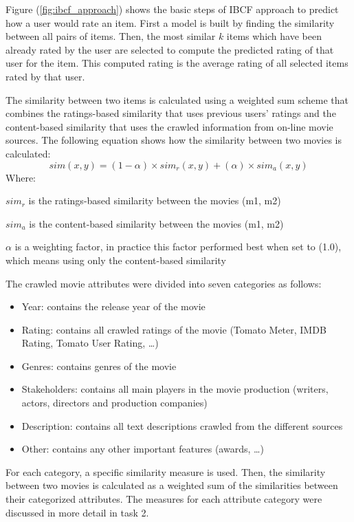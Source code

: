 \documentclass{sigish}
\begin{document}
Figure (\ref{fig:ibcf_approach}) shows the basic steps of IBCF approach to predict how a user would rate an item. First a model is built by finding the similarity between all pairs of items. Then, the most similar $ k $ items which have been already rated by the user are selected to compute the predicted rating of that user for the item. This computed rating is the average rating of all selected items rated by that user.

The similarity between two items is calculated using a weighted sum scheme that combines the ratings-based similarity that uses previous users' ratings and the content-based similarity that uses the crawled information from on-line movie sources. The following equation shows how the similarity between two movies is calculated:
\begin{equation}
sim(x, y) = (1 - \alpha) \times sim_{r}(x, y) + (\alpha) \times sim_{a}(x, y)
\end{equation}
Where:

$ sim_{r} $ is the ratings-based similarity between the movies (m1, m2)

$ sim_{a} $ is the content-based similarity between the movies (m1, m2)

$ \alpha $  is a weighting factor, in practice this factor performed best when set to (1.0), which means using only the content-based similarity

The crawled movie attributes were divided into seven categories as follows:
\begin{itemize}
	\item Year: contains the release year of the movie
	\item Rating: contains all crawled ratings of the movie (Tomato Meter, IMDB Rating, Tomato User Rating, …)
	\item Genres: contains genres of the movie
	\item Stakeholders: contains all main players in the movie production (writers, actors, directors and production companies)
	\item Description: contains all text descriptions crawled from the different sources
	\item Other: contains any other important features (awards, …)
\end{itemize}
For each category, a specific similarity measure is used. Then, the similarity between two movies is calculated as a weighted sum of the similarities between their categorized attributes. The measures for each attribute category were discussed in more detail in task 2.
\end{document}
